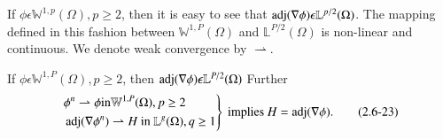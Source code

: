 If $\phi \epsilon \mathbb{W}^{1,p}(\Omega), p \ge 2$, then it is
easy to see that $\operatorname{adj}  (\nabla \phi) \epsilon
\mathbb{L}^{p/2}(\Omega)$. 
The mapping defined in this fashion between $\mathbb{W}^{1,P}(\Omega)$
and $\mathbb{L}^{P/2}(\Omega)$ is non-linear and continuous. We denote
weak convergence by $\rightharpoonup$. 

\begin{theorem}\label{chap2-thm2.6.2}%
If $\phi \epsilon \mathbb{W}^{1,P}(\Omega), p \ge 2$, then
$\operatorname{adj} (\nabla \phi) \epsilon \mathbb{L}^{P/2}(\Omega)$ Further 
\begin{equation*}
  \left.
  \begin{aligned}
    & \phi^n \rightharpoonup \phi \text{in} \mathbb{W}^{1,P}(\Omega), p \ge 2 \\
    & \operatorname{adj} (\nabla \phi^n) \rightharpoonup H ~\text{in}~
    \mathbb{L}^g(\Omega), q \ge 1 
  \end{aligned}
  \right\} ~{\rm implies}~ H= \operatorname{adj} (\nabla \phi
  ). \tag{2.6-23}\label{eq2.6-23} 
\end{equation*}
\end{theorem}


